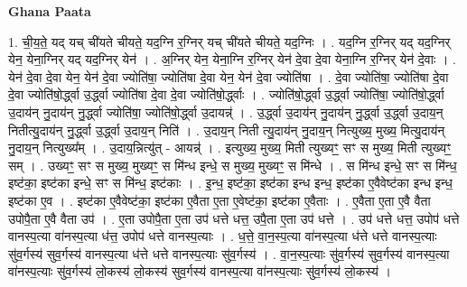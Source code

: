 \documentclass[17pt]{extarticle}
\begin{document}
\textbf{Ghana Paata } \newline

1. ची॒य॒ते॒ यद् यच् ची॑यते चीयते॒ यद॒ग्नि र॒ग्निर् यच् ची॑यते चीयते॒ यद॒ग्निः । . यद॒ग्नि र॒ग्निर् यद् यद॒ग्निर् येन॒ येना॒ग्निर् यद् यद॒ग्निर् येन॑ । . अ॒ग्निर् येन॒ येना॒ग्नि र॒ग्निर् येन॑ दे॒वा दे॒वा येना॒ग्नि र॒ग्निर् येन॑ दे॒वाः । . येन॑ दे॒वा दे॒वा येन॒ येन॑ दे॒वा ज्योति॑षा॒ ज्योति॑षा दे॒वा येन॒ येन॑ दे॒वा ज्योति॑षा । . दे॒वा ज्योति॑षा॒ ज्योति॑षा दे॒वा दे॒वा ज्योति॑षो॒र्द्ध्वा उ॒र्द्ध्वा ज्योति॑षा दे॒वा दे॒वा ज्योति॑षो॒र्द्ध्वाः । . ज्योति॑षो॒र्द्ध्वा उ॒र्द्ध्वा ज्योति॑षा॒ ज्योति॑षो॒र्द्ध्वा उ॒दाय॑न् नु॒दाय॑न् नु॒र्द्ध्वा ज्योति॑षा॒ ज्योति॑षो॒र्द्ध्वा उ॒दायन्न्॑ । . उ॒र्द्ध्वा उ॒दाय॑न् नु॒दाय॑न् नु॒र्द्ध्वा उ॒र्द्ध्वा उ॒दाय॒न् नितीत्यु॒दाय॑न् नु॒र्द्ध्वा उ॒र्द्ध्वा उ॒दाय॒न् निति॑ । . उ॒दाय॒न् निती त्यु॒दाय॑न् नु॒दाय॒न् नित्युख्य॒ मुख्य॒ मित्यु॒दाय॑न् नु॒दाय॒न् नित्युख्य᳚म् । . उ॒दाय॒न्नित्यु॑त् - आयन्न्॑ । . इत्युख्य॒ मुख्य॒ मिती त्युख्यꣳ॒॒ सꣳ स मुख्य॒ मिती त्युख्यꣳ॒॒ सम् । . उख्यꣳ॒॒ सꣳ स मुख्य॒ मुख्यꣳ॒॒ स मि॑न्ध इन्धे॒ स मुख्य॒ मुख्यꣳ॒॒ स मि॑न्धे । . स मि॑न्ध इन्धे॒ सꣳ स मि॑न्ध॒ इष्ट॑का॒ इष्ट॑का इन्धे॒ सꣳ स मि॑न्ध॒ इष्ट॑काः । . इ॒न्ध॒ इष्ट॑का॒ इष्ट॑का इन्ध इन्ध॒ इष्ट॑का ए॒वैवेष्ट॑का इन्ध इन्ध॒ इष्ट॑का ए॒व । . इष्ट॑का ए॒वैवेष्ट॑का॒ इष्ट॑का ए॒वैता ए॒ता ए॒वेष्ट॑का॒ इष्ट॑का ए॒वैताः । . ए॒वैता ए॒ता ए॒वै वैता उपोपै॒ता ए॒वै वैता उप॑ । . ए॒ता उपोपै॒ता ए॒ता उप॑ धत्ते धत्त॒ उपै॒ता ए॒ता उप॑ धत्ते । . उप॑ धत्ते धत्त॒ उपोप॑ धत्ते वानस्प॒त्या वा॑नस्प॒त्या ध॑त्त॒ उपोप॑ धत्ते वानस्प॒त्याः । . ध॒त्ते॒ वा॒न॒स्प॒त्या वा॑नस्प॒त्या ध॑त्ते धत्ते वानस्प॒त्याः सु॑व॒र्गस्य॑ सुव॒र्गस्य॑ वानस्प॒त्या ध॑त्ते धत्ते वानस्प॒त्याः सु॑व॒र्गस्य॑ । . वा॒न॒स्प॒त्याः सु॑व॒र्गस्य॑ सुव॒र्गस्य॑ वानस्प॒त्या वा॑नस्प॒त्याः सु॑व॒र्गस्य॑ लो॒कस्य॑ लो॒कस्य॑ सुव॒र्गस्य॑ वानस्प॒त्या वा॑नस्प॒त्याः सु॑व॒र्गस्य॑ लो॒कस्य॑ । \newline
\end{document}
